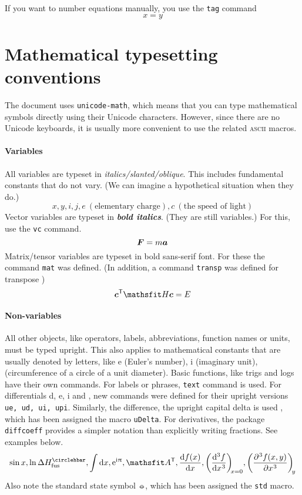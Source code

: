 \documentclass{article}
\begin{document}
If you want to number equations manually, you use the \texttt{tag} command
\[
x=y
\tag{4}
\]

\section{Mathematical typesetting conventions}
The document uses \texttt{unicode-math}, which means that you can type mathematical symbols directly using their Unicode characters. However, since there are no Unicode keyboards, it is usually more convenient to use the related \textsc{ascii} macros.

\paragraph{Variables} All variables are typeset in \textit{italics/slanted/oblique}. This includes fundamental constants that do not vary. (We can imagine a hypothetical situation when they do.)
\[
x, y, i, j, e\ (\text{elementary charge}), c\ (\text{the speed of light})
\]
Vector variables are typeset in \textbf{\textit{bold italics}}. (They are still variables.) For this, use the \texttt{vc} command.
\[
\bm{F} = m \bm{a}
\]
Matrix/tensor variables are typeset in bold sans-serif font. For these the command \texttt{mat} was defined. (In addition, a command \texttt{transp} was defined for transpose \transp)
\[
\vc{c}^\transp \mat{H} \vc{c} = E
\]
\paragraph{Non-variables} All other objects, like operators, labels, abbreviations, function names or units, must be typed upright. This also applies to mathematical constants that are usually denoted by letters, like e (Euler's number), i (imaginary unit), \upi (circumference of a circle of a unit diameter). Basic functions, like trigs and logs have their own commands. For labels or phrases, \texttt{text} command is used. For differentials d, e, i and \upi, new commands were defined for their upright versions \texttt{ue, ud, ui, upi}. Similarly, the difference, the upright capital delta is used \uDelta, which has been assigned the macro \texttt{uDelta}. For derivatives, the package \texttt{diffcoeff} provides a simpler notation than explicitly writing fractions. See examples below.
\[
\sin x, \ln \uDelta H_\mathrm{fus}^\std,\int \ud x, \ue^{\ui \upi}, \mat{A}^\transp, \diff{f(x)}{x}, \diff[3]{f}{x}[x=0], \diffp[3]{f(x,y)}{x}[y]
\]
Also note the standard state symbol $\circlehbar$, which has been assigned the \texttt{std} macro.
\end{document}

